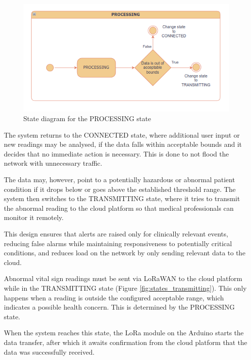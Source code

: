 \begin{figure}[H]
	\centering
	\includegraphics[width=\textwidth]{diagrams/states_processing}
	\caption{State diagram for the PROCESSING state}
	\label{fig:states_processing}
\end{figure}

The system returns to the CONNECTED state, where additional user input or new readings may be analysed, if the data falls within acceptable bounds and it decides that no immediate action is necessary. This is done to not flood the network with unnecessary traffic.

The data may, however, point to a potentially hazardous or abnormal patient condition if it drops below or goes above the established threshold range. The system then switches to the TRANSMITTING state, where it tries to transmit the abnormal reading to the cloud platform so that medical professionals can monitor it remotely.

This design ensures that alerts are raised only for clinically relevant events, reducing false alarms while maintaining responsiveness to potentially critical conditions, and reduces load on the network by only sending relevant data to the cloud.

Abnormal vital sign readings must be sent via LoRaWAN to the cloud platform while in the TRANSMITTING state (Figure \ref{fig:states_transmitting}). This only happens when a reading is outside the configured acceptable range, which indicates a possible health concern. This is determined by the PROCESSING state.

When the system reaches this state, the LoRa module on the Arduino starts the data transfer, after which it awaits confirmation from the cloud platform that the data was successfully received.

